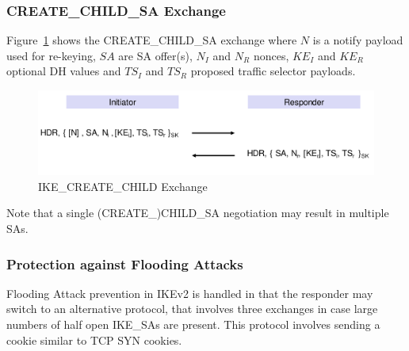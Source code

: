 \subsubsection{CREATE\_CHILD\_SA Exchange}
Figure~\ref{fig:ike_create_child_sa} shows the CREATE\_CHILD\_SA exchange where $N$ is a notify payload used for re-keying, $SA$ are SA offer(s), $N_I$ and $N_R$ nonces, $KE_I$ and $KE_R$ optional DH values and $TS_I$ and $TS_R$ proposed traffic selector payloads.
\begin{figure}[h]
  \centering
  \includegraphics[width=.8\textwidth]{figures/ike_create_child_sa.png}
  \caption{IKE\_CREATE\_CHILD Exchange}\label{fig:ike_create_child_sa}
\end{figure}

Note that a single (CREATE\_)CHILD\_SA negotiation may result in multiple SAs.

\subsubsection{Protection against Flooding Attacks}
Flooding Attack prevention in IKEv2 is handled in that the responder may switch to an alternative protocol, that involves three exchanges in case large numbers of half open IKE\_SAs are present.
This protocol involves sending a cookie similar to TCP SYN cookies.

